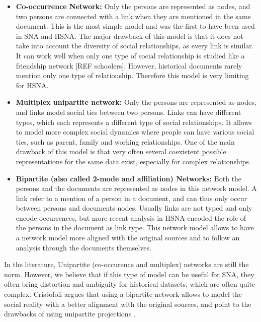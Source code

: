 \documentclass{vgtc}                          %
\begin{document}
\begin{itemize}[noitemsep]
    \item \textbf{Co-occurrence Network:} Only the persons are represented as nodes, and two persons are connected with a link when they are mentioned in the same document. This is the most simple model and was the first to have been used in SNA and HSNA. The major drawback of this model is that it does not take into account the diversity of social relationships, as every link is similar. It can work well when only one type of social relationship is studied like a friendship network [REF schoolers]. However, historical documents rarely mention only one type of relationship. Therefore this model is very limiting for HSNA.
    \item \textbf{Multiplex unipartite network:} Only the persons are represented as nodes, and links model social ties between two persons. Links can have different types, which each represents a different type of social relationships. It allows to model more complex social dynamics where people can have various social ties, such as parent, family and working relationships. One of the main drawback of this model is that very often several coexistent possible representations for the same data exist, especially for complex relationships.
    \item \textbf{Bipartite (also called 2-mode and affiliation) Networks:} Both the persons and the documents are represented as nodes in this network model. A link refer to a mention of a person in a document, and can thus only occur between persons and documents nodes. Usually links are not typed and only encode occurrences, but more recent analysis in HSNA encoded the role of the persons in the document as link type. This network model allows to have a network model more aligned with the original sources and to follow an analysis through the documents themselves. 
\end{itemize}

In the literature, Unipartite (co-occurence and multiplex) networks are still the norm. However, we believe that if this type of model can be useful for SNA, they often bring distortion and ambiguity for historical datasets, which are often quite complex. Cristofoli argues that using a bipartite network allows to model the social reality with a better alignment with the original sources, and point to the drawbacks of using unipartite projections \cite{cristofoli_aux_2008}.
\end{document}
